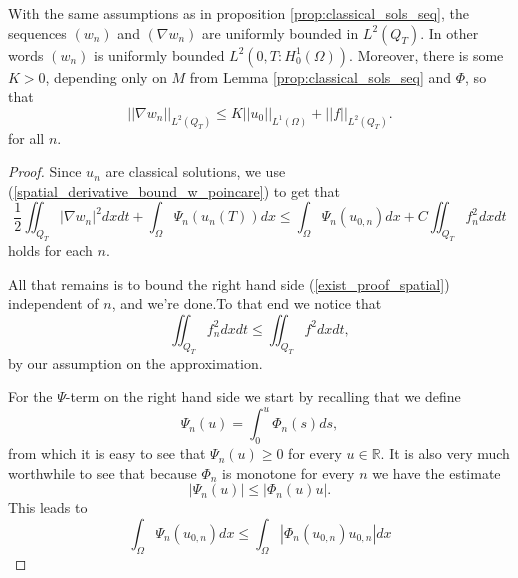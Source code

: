 \documentclass[11pt, a4paper]{article}
\begin{document}
\begin{lemma}
\label{prop:spatial_boundedness}
With the same assumptions as in proposition \ref{prop:classical_sols_seq},
the sequences $(w_n)$ and $(\nabla w_n)$ are uniformly bounded in $L^2(Q_T)$. In other words $(w_n)$ is uniformly bounded $L^2(0,T: H^1_0(\Omega))$. Moreover, there is some $K >0$, depending only on $M$ from Lemma \ref{prop:classical_sols_seq} and $\Phi$, so that
\begin{equation}
\label{gradwn_bound_uniform}
||\nabla w_n||_{L^2(Q_T)} \leq K||u_0||_{L^1(\Omega)} + ||f||_{L^2(Q_T)}.
\end{equation}
for all $n$.
\end{lemma}
\begin{proof}
Since $u_n$ are classical solutions, we use (\ref{spatial_derivative_bound_w_poincare}) to get that
	\begin{equation}
	\label{exist_proof_spatial}
	\frac{1}{2}\iint_{Q_T}|\nabla w_n|^2 dxdt + \int_\Omega \Psi_n(u_n(T))dx  \leq \int_\Omega \Psi_n(u_{0,n})dx + C\iint_{Q_T}f_n^2 dxdt
	\end{equation}
	holds for each $n$.


	All that remains is to bound the right hand side (\ref{exist_proof_spatial}) independent of $n$, and we're done.To that end we notice that
	\begin{equation*}
	\iint_{Q_T}f_n^2dxdt \leq \iint_{Q_T} f^2 dxdt,
	\end{equation*}
	by our assumption on the approximation.
	
	For the $\Psi$-term on the right hand side we start by recalling that we define
	\begin{equation*}
	\Psi_n(u) = \int_0^{u}\Phi_n(s)ds,
	\end{equation*}
	from which it is easy to see that $\Psi_n(u) \geq 0$ for every $u \in \mathbb{R}$. It is also very much worthwhile to see that because $\Phi_n$ is monotone for every $n$ we have the estimate
	\begin{equation*}
	|\Psi_n(u)| \leq |\Phi_n(u)u|.
	\end{equation*}
	This leads to
	\begin{equation*}
	\int_\Omega \Psi_n(u_{0,n})dx \leq \int_\Omega |\Phi_n(u_{0,n})u_{0,n}|dx	
	\end{equation*}


\end{proof}
\end{document}
